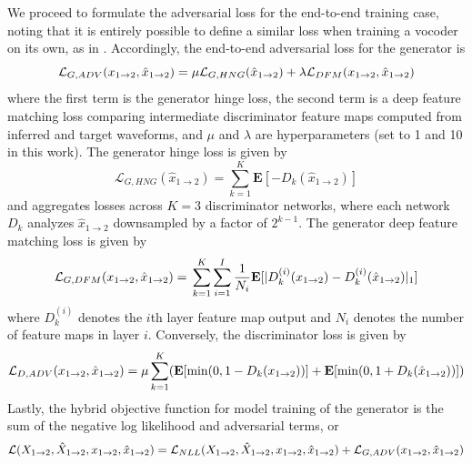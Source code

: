 \documentclass{article}
\begin{document}
\begin{sloppy}
We proceed to formulate the adversarial loss for the end-to-end training case, noting that it is entirely possible to define a similar loss when training a vocoder on its own, as in \cite{MelGAN, HooliGan}.  Accordingly, the end-to-end adversarial loss for the generator is
\begin{equation}
\mathcal{L}_{G,ADV}(x_{1\rightarrow2}, \hat{x}_{1\rightarrow2}) = \\ \mu\mathcal{L}_{G,HNG}(\hat{x}_{1\rightarrow2}) + \lambda\mathcal{L}_{DFM}(x_{1\rightarrow2}, \hat{x}_{1\rightarrow2})
\end{equation} 
where the first term is the generator hinge loss, the second term is a deep feature matching loss comparing intermediate discriminator feature maps computed from inferred and target waveforms, and $\mu$ and $\lambda$ are hyperparameters (set to 1 and 10 in this work).  The generator hinge loss is given by
\begin{equation} \label{eqn:ghinge}
\mathcal{L}_{G,HNG}(\hat{x}_{1\rightarrow2}) = \sum_{k=1}^{K}\mathbf{E}[-D_k(\hat{x}_{1\rightarrow2})]
\end{equation}
and aggregates losses across $K=3$ discriminator networks, where each network $D_k$ analyzes $\hat{x}_{1\rightarrow2}$ downsampled by a factor of $2^{k-1}$. The generator deep feature matching loss is given by
\begin{equation} 
\mathcal{L}_{G,DFM}(x_{1\rightarrow2}, \hat{x}_{1\rightarrow2}) = \\ \sum_{k=1}^{K}\sum_{i=1}^{I}\frac{1}{N_i}\mathbf{E}[|D_{k}^{(i)}(x_{1\rightarrow2})-D_{k}^{(i)}(\hat{x}_{1\rightarrow2})|_1]
\end{equation} 
where $D_{k}^{(i)}$ denotes the $i$th layer feature map output and $N_i$ denotes the number of feature maps in layer $i$.  Conversely, the discriminator loss is given by
\begin{equation}
\mathcal{L}_{D,ADV}({x}_{1\rightarrow2},\hat{x}_{1\rightarrow2}) = \mu\sum_{k=1}^{K}(\mathbf{E}[\min(0, 1-D_k(x_{1\rightarrow2}))] \\ +
\mathbf{E}[\min(0, 1+D_k(\hat{x}_{1\rightarrow2}))])
\end{equation}
Lastly, the hybrid objective function for model training of the generator is the sum of the negative log likelihood and adversarial terms, or
\begin{equation}
\mathcal{L}(X_{1\rightarrow2}, \hat{X}_{1\rightarrow2}, x_{1\rightarrow2}, \hat{x}_{1\rightarrow2}) = \\ \mathcal{L}_{NLL}(X_{1\rightarrow2}, \hat{X}_{1\rightarrow2}, x_{1\rightarrow2}, \hat{x}_{1\rightarrow2}) + \mathcal{L}_{G, ADV}(x_{1\rightarrow2}, \hat{x}_{1\rightarrow2})
\end{equation} 


\end{sloppy}
\end{document}
